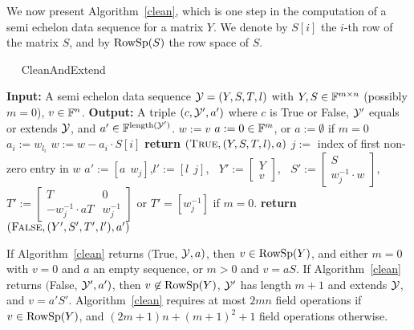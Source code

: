 \medskip
We now present Algorithm~\ref{clean}, which is one step in the
computation of a semi echelon data sequence for a matrix $Y$. We
denote by $S[i]$ the $i$-th row of the matrix $S$, and by $\mathrm{RowSp}(S)$ the 
row space of $S$.

\begin{algorithm}
\caption{$\quad$ \sc CleanAndExtend}
\label{clean}
\begin{algorithmic}
\STATE \textbf{Input:} A semi echelon data sequence $\mathcal{Y}=(Y,S,T,l)$ with 
         $Y,S \in \mathbb{F}^{m \times n}$  (possibly $m=0$), 
\STATE \mbox{} $v \in \mathbb{F}^n$.
\STATE \textbf{Output:} A triple $(c,\mathcal{Y}',a')$ where $c$ is {\sc True} 
or {\sc False}, $\mathcal{Y}'$ equals or extends $\mathcal{Y}$, 
\STATE \mbox{} and $a'\in\mathbb{F}^{\mathrm{length} (\mathcal{Y}')}$.
\vspace*{2mm}
\STATE $w := v$
\STATE $a := 0 \in \mathbb{F}^m$, or $a:=\emptyset$ if $m=0$ \hspace*{2mm}
    \STATE $a_i := w_{l_i}$
    \STATE $w := w - a_i \cdot S[i]$
\ENDFOR\hspace*{6mm}
    \STATE \textbf{return} $(\mbox{\sc True},(Y,S,T,l),a)$
\ELSE
    \STATE $j := $ index of first non-zero entry in $w$
    \STATE $a' := [ a \ \ w_j ]$,\quad $l' := \left[ l \ \ j \right]$, $\ $
    \STATE $Y' := \left[ 
       \begin{array}{c} Y \\ v \end{array} \right]$, $\ $
           $S' := \left[ 
       \begin{array}{c} S \\ w_j^{-1} \cdot w \end{array} \right]$, $\ $
           $T' := \left[ 
       \begin{array}{cc} T & 0 \\ -w_j^{-1}\cdot aT & w_j^{-1} 
       \end{array} \right]$
       or $T'=\left[ w_j^{-1}\right]$ if $m=0$.
    \STATE \textbf{return} $(\mbox{\sc False}, (Y',S',T',l'), a' )$
\ENDIF
\end{algorithmic}
\end{algorithm}

\begin{Prop}
If Algorithm~\ref{clean} returns $(${\sc True}, $\mathcal{Y},a)$, then $v\in\mathrm{RowSp}
(Y)$, and either $m=0$ with $v=0$ and $a$ an empty sequence, or $m>0$ and $v=aS$. If 
Algorithm~\ref{clean} returns $(${\sc False}, $\mathcal{Y}',a')$, then $v\not
\in\mathrm{RowSp}(Y)$, $\mathcal{Y}'$ has length $m+1$ and extends $\mathcal{Y}$, and $v=a'S'$.
Algorithm~\ref{clean} requires at most $2mn$ field operations
if $v\in\mathrm{RowSp}(Y)$, and
$(2m+1)n + (m+1)^2 + 1$ field operations otherwise.
\end{Prop}

